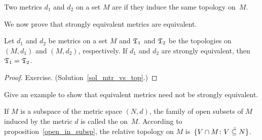 \begin{defn}\label{def_equiv_metrics} Two metrics $d_1$ and $d_2$ on a set $M$ are
 if they induce the same topology on~$M$.
\end{defn}

We now prove that strongly equivalent metrics are equivalent.

\begin{prop}\label{mtr_vs_top} Let $d_1$ and $d_2$ be metrics on a set $M$ and $\mathfrak{T}_1$ and
$\mathfrak{T}_2$ be the topologies on $(M,d_1)$ and $(M,d_2)$, respectively. If $d_1$ and
$d_2$ are strongly equivalent, then $\mathfrak{T}_1 = \mathfrak{T}_2$.
\end{prop}

\begin{proof} Exercise. (Solution~\ref{sol_mtr_vs_top}.)
  \ns \end{proof}



\begin{prob} Give an example to show that equivalent metrics need not be strongly
equivalent.
\end{prob}

\begin{defn} If $M$ is a subspace of the metric space $(N,d)$, the family of open subsets of $M$
induced by the metric $d$ is called the
%
%
 on~$M$.  According to proposition~\ref{open_in_subsp}, the relative
topology on $M$ is~$\{V \cap M \colon V\overset{\thickspace{}_\circ}{\subseteq}N\}$.
\end{defn}
